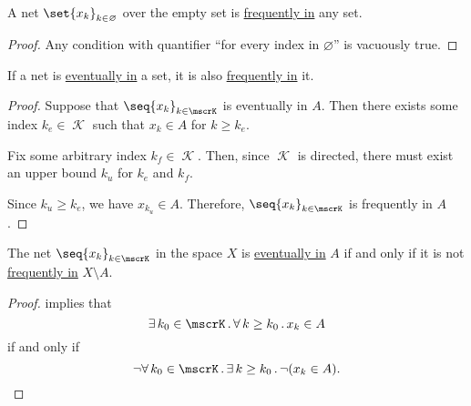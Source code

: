 \begin{proposition}\label{thm:empty_index_set_implies_frequently_in}
  A net \( \set{ x_k }_{k \in \varnothing} \) over the empty set is \hyperref[def:net_frequently_in]{frequently in} any set.
\end{proposition}
\begin{proof}
  Any condition with quantifier \enquote{for every index in \( \varnothing \)} is vacuously true.
\end{proof}

\begin{proposition}\label{thm:eventually_in_implies_frequently_in}
  If a net is \hyperref[def:net_eventually_in]{eventually in} a set, it is also \hyperref[def:net_frequently_in]{frequently in} it.
\end{proposition}
\begin{proof}
  Suppose that \( \seq{ x_k }_{k \in \mscrK} \) is eventually in \( A \). Then there exists some index \( k_e \in \mscrK \) such that \( x_k \in A \) for \( k \geq k_e \).

  Fix some arbitrary index \( k_f \in \mscrK \). Then, since \( \mscrK \) is directed, there must exist an upper bound \( k_u \) for \( k_e \) and \( k_f \).

  Since \( k_u \geq k_e \), we have \( x_{k_u} \in A \). Therefore, \( \seq{ x_k }_{k \in \mscrK} \) is frequently in \( A \).
\end{proof}

\begin{proposition}\label{thm:eventually_and_frequently_in}
  The net \( \seq{ x_k }_{k \in \mscrK} \) in the space \( X \) is \hyperref[def:net_eventually_in]{eventually in} \( A \) if and only if it is not \hyperref[def:net_frequently_in]{frequently in} \( X \setminus A \).
\end{proposition}
\begin{proof}
   implies that
  \begin{equation*}
    \qexists {k_0 \in \mscrK} \qforall {k \geq k_0} x_k \in A
  \end{equation*}
  if and only if
  \begin{equation*}
    \neg \qforall {k_0 \in \mscrK} \qexists {k \geq k_0} \neg (x_k \in A).
  \end{equation*}
\end{proof}

